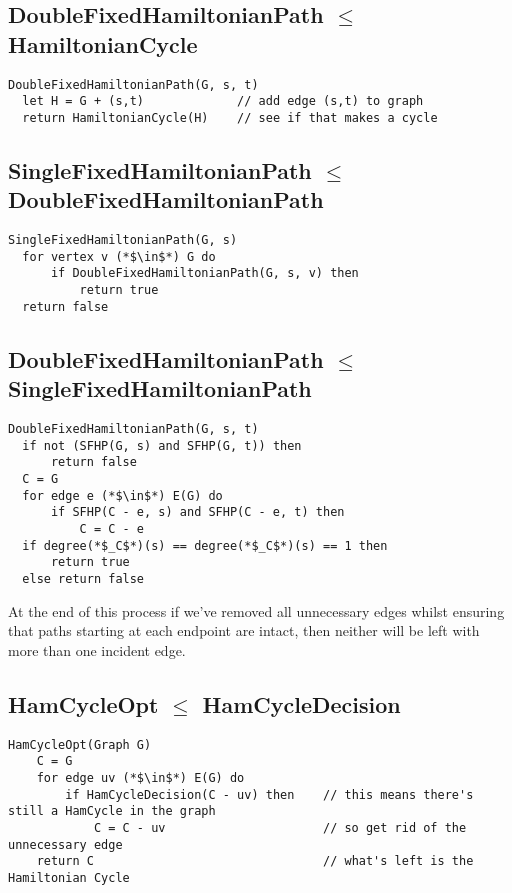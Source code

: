 \documentclass[12pt]{article}
\providecommand{\reducible}[2]{
  \textbf{#1} $\leq$ \textbf{#2}
}
\begin{document}
\subsection{\reducible{DoubleFixedHamiltonianPath}{HamiltonianCycle}}
\begin{lstlisting}
DoubleFixedHamiltonianPath(G, s, t)
  let H = G + (s,t)             // add edge (s,t) to graph
  return HamiltonianCycle(H)    // see if that makes a cycle
\end{lstlisting}

\subsection{\reducible{SingleFixedHamiltonianPath}{DoubleFixedHamiltonianPath}}
\begin{lstlisting}
SingleFixedHamiltonianPath(G, s)
  for vertex v (*$\in$*) G do
      if DoubleFixedHamiltonianPath(G, s, v) then
          return true
  return false
\end{lstlisting}

\subsection{\reducible{DoubleFixedHamiltonianPath}{SingleFixedHamiltonianPath}}
\begin{lstlisting}
DoubleFixedHamiltonianPath(G, s, t)
  if not (SFHP(G, s) and SFHP(G, t)) then
      return false
  C = G
  for edge e (*$\in$*) E(G) do
      if SFHP(C - e, s) and SFHP(C - e, t) then
          C = C - e
  if degree(*$_C$*)(s) == degree(*$_C$*)(s) == 1 then
      return true
  else return false
\end{lstlisting}
At the end of this process if we've removed all unnecessary edges whilst ensuring that paths starting at each endpoint are
intact, then neither will be left with more than one incident edge.

\subsection{\reducible{HamCycleOpt}{HamCycleDecision}}
\begin{lstlisting}
HamCycleOpt(Graph G)
    C = G
    for edge uv (*$\in$*) E(G) do
        if HamCycleDecision(C - uv) then    // this means there's still a HamCycle in the graph
            C = C - uv                      // so get rid of the unnecessary edge
    return C                                // what's left is the Hamiltonian Cycle
\end{lstlisting}
\end{document}
